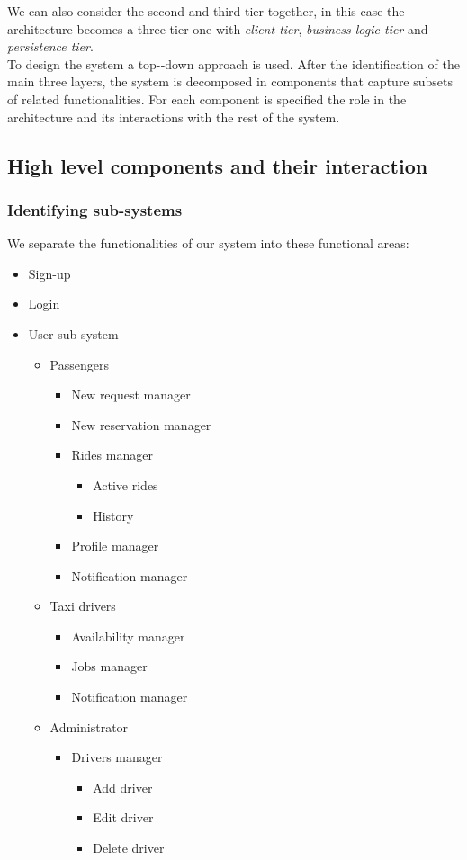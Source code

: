 \documentclass[a4paper,11pt]{report} %
\begin{document}
	We can also consider the second and third tier together, in this case the architecture becomes a three-tier one with \textit{client tier}, \textit{business logic tier} and \textit{persistence tier}.\\
	To design the system a top-­‐down approach is used. After the identification of the main three layers, the system is decomposed in components that capture subsets of related functionalities. For each component is specified the role in the architecture and its interactions with the rest of the system. 
	
	\subsection{High level components and their interaction} 
	
	\subsubsection{Identifying sub-systems} We separate the functionalities of our system into these functional areas:
	\begin{itemize}
		\item Sign-up
		\item Login
		\item User sub-system
			\begin{itemize}
				\item Passengers
				\begin{itemize}
					\item New request manager
					\item New reservation manager
					\item Rides manager
					\begin{itemize}
						\item Active rides
						\item History
					\end{itemize}
					\item Profile manager
					\item Notification manager
				\end{itemize}
				\item Taxi drivers
				\begin{itemize}
					\item Availability manager
					\item Jobs manager
					\item Notification manager
				\end{itemize}
				\item Administrator
				\begin{itemize}
					\item Drivers manager
					\begin{itemize}
						\item Add driver
						\item Edit driver
						\item Delete driver
					\end{itemize}
				\end{itemize}
			\end{itemize}
	\end{itemize}
\end{document}
